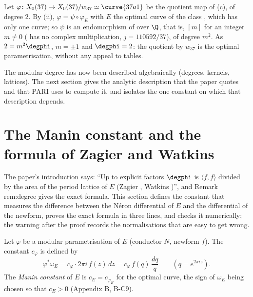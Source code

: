 \begin{example}\label{ex:moddeg:37}
Let $\varphi\colon X_0(37)\to X_0(37)/w_{37}\simeq\curve{37a1}$ be the quotient map of (c), of degree $2$. By (ii), $\varphi=\psi\circ\varphi_E$
with $E$ the optimal curve of the class , which has only one curve; so $\psi$ is an endomorphism of  over $\Q$, that is, $[m]$ for an integer $m\ne0$ ( has no
complex multiplication, $j=110592/37$), of degree $m^2$. As $2=m^2\degphi$, $m=\pm1$ and $\degphi=2$: the quotient by $w_{37}$ is the optimal parametrisation, without any appeal to
tables.
\end{example}

The modular degree has now been described algebraically (degrees, kernels, lattices). The next section gives the analytic description that the paper quotes and
that PARI uses to compute it, and isolates the one constant on which that description depends.

\section{The Manin constant and the formula of Zagier and Watkins}\label{sec:moddeg:manin}

The paper's introduction says: ``Up to explicit factors $\degphi$ is $\langle f,f\rangle$ divided by the area of the period lattice of $E$ (Zagier \cite{Zagier85}, Watkins
\cite{Watkins02})'', and Remark rem:degree gives the exact formula. This section defines the constant that measures the difference between the N\'eron differential of $E$ and the
differential of the newform, proves the exact formula in three lines, and checks it numerically; the warning after the proof records the normalisations that are easy to get
wrong.

\begin{definition}\label{def:moddeg:manin-constant}
Let $\varphi$ be a modular parametrisation of $E$ (conductor $N$, newform $f$). The constant $c_\varphi$ is defined by
\[
\varphi^*\omega_E=c_\varphi\cdot2\pi i\,f(z)\,dz=c_\varphi\,f(q)\,\frac{dq}q\qquad(q=e^{2\pi iz}).
\]
The \emph{Manin constant} of $E$ is $c_E=c_{\varphi_E}$ for the optimal curve, the sign of $\omega_E$ being chosen so that $c_E>0$ (Appendix B, B-C9).
\end{definition}

